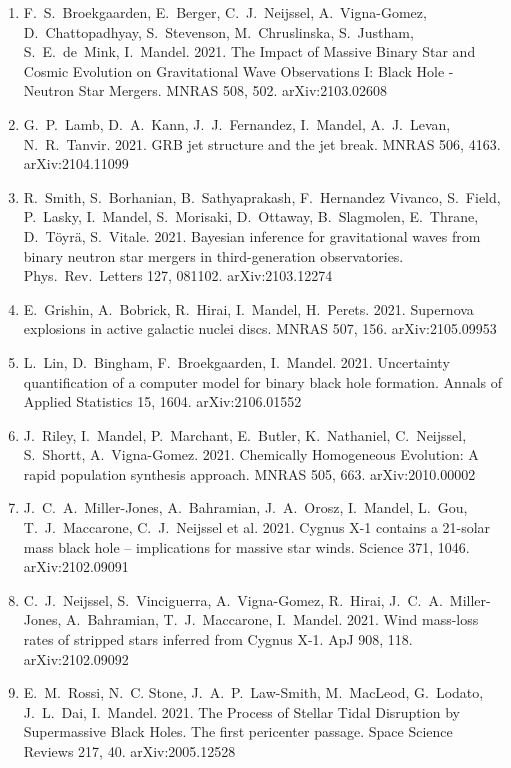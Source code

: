 \documentclass[margin,line]{res}
\begin{document}
\begin{resume}
\begin{enumerate}
\item F.~S.~Broekgaarden, E.~Berger, C.~J.~Neijssel, A.~Vigna-Gomez, D.~Chattopadhyay, S.~Stevenson, M.~Chruslinska, S.~Justham, S.~E.~de~Mink, I.~Mandel. 2021. The Impact of Massive Binary Star and Cosmic Evolution on Gravitational Wave Observations I: Black Hole - Neutron Star Mergers.  MNRAS 508, 502. arXiv:2103.02608

\item G.~P.~Lamb, D.~A.~Kann, J.~J.~Fernandez, I.~Mandel, A.~J.~Levan, N.~R.~Tanvir. 2021. GRB jet structure and the jet break. MNRAS 506, 4163.  arXiv:2104.11099

\item R.~Smith, S.~Borhanian, B.~Sathyaprakash, F.~Hernandez Vivanco, S.~Field, P.~Lasky, I.~Mandel, S.~Morisaki, D.~Ottaway, B.~Slagmolen, E.~Thrane, D.~T\"{o}yr\"{a}, S.~Vitale.  2021.  Bayesian inference for gravitational waves from binary neutron star mergers in third-generation observatories.  Phys.~Rev.~Letters 127, 081102. arXiv:2103.12274

\item E.~Grishin, A.~Bobrick, R.~Hirai, I.~Mandel, H.~Perets. 2021.  Supernova explosions in active galactic nuclei discs.  MNRAS 507, 156.  arXiv:2105.09953

\item L.~Lin, D.~Bingham, F.~Broekgaarden, I.~Mandel. 2021. Uncertainty quantification of a computer model for binary black hole formation. Annals of Applied Statistics 15, 1604.  arXiv:2106.01552 

\item J.~Riley, I.~Mandel, P.~Marchant, E.~Butler, K.~Nathaniel, C.~Neijssel, S.~Shortt, A.~Vigna-Gomez.  2021. Chemically Homogeneous Evolution: A rapid population synthesis approach. MNRAS 505, 663.  arXiv:2010.00002

\item J.~C.~A.~Miller-Jones, A.~Bahramian, J.~A.~Orosz, I.~Mandel, L.~Gou, T.~J.~Maccarone, C.~J.~Neijssel et al.  2021.  Cygnus X-1 contains a 21-solar mass black hole -- implications for massive star winds.  Science 371, 1046. arXiv:2102.09091

\item C.~J.~Neijssel, S.~Vinciguerra, A.~Vigna-Gomez, R.~Hirai, J.~C.~A.~Miller-Jones, A.~Bahramian, T.~J.~Maccarone, I.~Mandel.  2021.  Wind mass-loss rates of stripped stars inferred from Cygnus X-1. ApJ 908, 118.  arXiv:2102.09092

\item E.~M.~Rossi, N.~C. Stone, J.~A.~P.~Law-Smith, M.~MacLeod, G.~Lodato, J.~L.~Dai, I.~Mandel.  2021.  The Process of Stellar Tidal Disruption by Supermassive Black Holes. The first pericenter passage.  Space Science Reviews 217, 40.  arXiv:2005.12528


\end{enumerate}
\end{resume}
\end{document}

